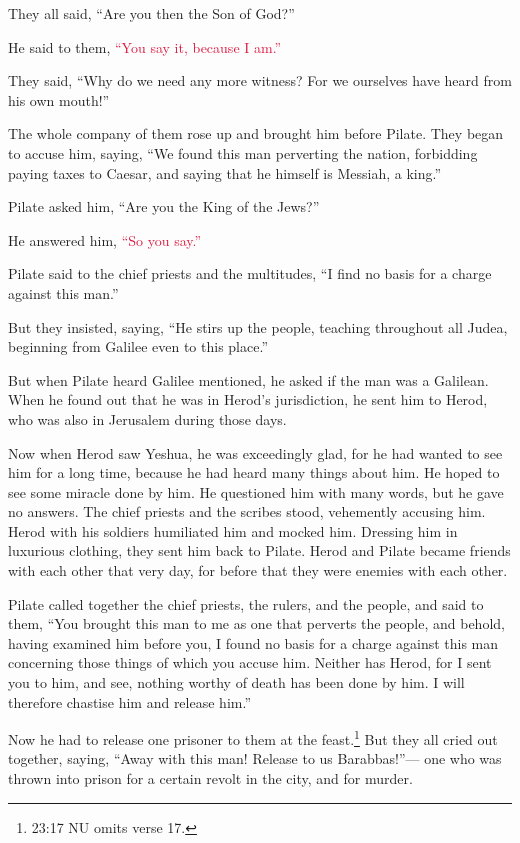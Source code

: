 \myverse{}They all said, “Are you then the Son of God?”

He said to them,
\textcolor{crimson}{“You say it, because I am.”}

\myverse{}They said, “Why do we need any more witness? For we ourselves
have heard from his own mouth!”


\mychapter{} \myverse*{}The whole company of them rose up and brought him before Pilate.
\myverse{}They began to accuse him, saying, “We found this man perverting the nation,
forbidding paying taxes to Caesar, and saying that he himself is Messiah, a king.”

\myverse{}Pilate asked him, “Are you the King of the Jews?”

He answered him,
\textcolor{crimson}{“So you say.”}

\myverse{}Pilate said to the chief priests and the multitudes, “I find no
basis for a charge against this man.”

\myverse{}But they insisted, saying, “He stirs up the people, teaching throughout
all Judea, beginning from Galilee even to this place.”

\myverse{}But when Pilate heard Galilee mentioned, he asked if the man was
a Galilean.
\myverse{}When he found out that he was in Herod’s jurisdiction, he sent him to Herod,
who was also in Jerusalem during those days.

\myverse{}Now when Herod saw Yeshua, he was exceedingly glad, for he had
wanted to see him for a long time, because he had heard many things about him. He hoped to see some miracle
done by him.
\myverse{}He questioned him with many words, but he gave no answers.
\myverse{}The chief priests and the scribes stood, vehemently accusing him.
\myverse{}Herod with his soldiers humiliated him and mocked him. Dressing him in luxurious
clothing, they sent him back to Pilate.
\myverse{}Herod and Pilate became friends with each other that very day, for before
that they were enemies with each other.

\myverse{}Pilate called together the chief priests, the rulers, and the
people,
\myverse{}and said to them, “You brought this man to me as one that perverts the people,
and behold, having examined him before you, I found no basis for a charge against this man concerning
those things of which you accuse him.
\myverse{}Neither has Herod, for I sent you to him, and see, nothing worthy of death
has been done by him.
\myverse{}I will therefore chastise him and release him.”

\myverse{}Now he had to release one prisoner to them at the feast.\footnote{23:17 NU omits verse 17.}
\myverse{}But they all cried out together, saying, “Away with this man! Release to
us Barabbas!”—
\myverse{}one who was thrown into prison for a certain revolt in the city, and for
murder.


